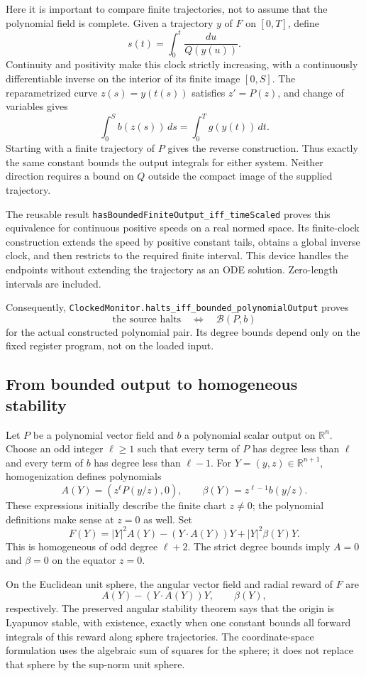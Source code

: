 \documentclass[11pt]{article}
\newcommand{\R}{\mathbb R}
\newcommand{\code}[1]{{\small\nolinkurl{#1}}}
\begin{document}
Here it is important to compare finite trajectories, not to assume that
the polynomial field is complete. Given a trajectory $y$ of $F$ on
$[0,T]$, define
\[
 s(t)=\int_0^t\frac{du}{Q(y(u))}.
\]
Continuity and positivity make this clock strictly increasing, with a
continuously differentiable inverse on the interior of its finite image
$[0,S]$. The reparametrized curve $z(s)=y(t(s))$ satisfies $z'=P(z)$,
and change of variables gives
\[
 \int_0^S b(z(s))\,ds=\int_0^T g(y(t))\,dt.
\]
Starting with a finite trajectory of $P$ gives the reverse construction.
Thus exactly the same constant bounds the output integrals for either
system. Neither direction requires a bound on $Q$ outside the compact
image of the supplied trajectory.

The reusable result
\code{hasBoundedFiniteOutput_iff_timeScaled} proves this equivalence for
continuous positive speeds on a real normed space. Its finite-clock
construction extends the speed by positive constant tails, obtains a
global inverse clock, and then restricts to the required finite interval.
This device handles the endpoints without extending the trajectory as
an ODE solution. Zero-length intervals are included.

Consequently,
\code{ClockedMonitor.halts_iff_bounded_polynomialOutput} proves
\[
 \text{the source halts}\quad\Longleftrightarrow\quad\mathcal B(P,b)
\]
for the actual constructed polynomial pair. Its degree bounds depend
only on the fixed register program, not on the loaded input.

\subsection{From bounded output to homogeneous stability}

Let $P$ be a polynomial vector field and $b$ a polynomial scalar output
on $\R^n$. Choose an odd integer $\ell\ge1$ such that every term of $P$
has degree less than $\ell$ and every term of $b$ has degree less than
$\ell-1$. For $Y=(y,z)\in\R^{n+1}$, homogenization defines polynomials
\[
 A(Y)=(z^\ell P(y/z),0),\qquad
 \beta(Y)=z^{\ell-1}b(y/z).
\]
These expressions initially describe the finite chart $z\ne0$; the
polynomial definitions make sense at $z=0$ as well. Set
\[
 F(Y)=|Y|^2A(Y)-(Y\cdot A(Y))Y+|Y|^2\beta(Y)Y.
\]
This is homogeneous of odd degree $\ell+2$. The strict degree bounds
imply $A=0$ and $\beta=0$ on the equator $z=0$.

On the Euclidean unit sphere, the angular vector field and radial
reward of $F$ are
\[
 A(Y)-(Y\cdot A(Y))Y,\qquad \beta(Y),
\]
respectively. The preserved angular stability theorem says that the
origin is Lyapunov stable, with existence, exactly when one constant
bounds all forward integrals of this reward along sphere trajectories.
The coordinate-space formulation uses the algebraic sum of squares for
the sphere; it does not replace that sphere by the sup-norm unit sphere.
\end{document}
